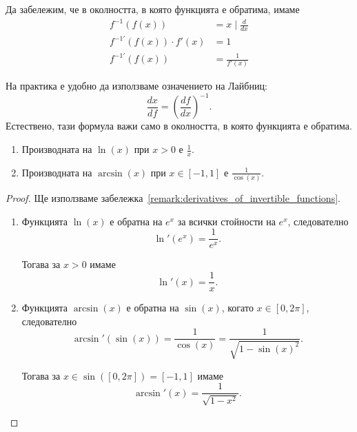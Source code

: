 \documentclass[numbers=endperiod, bibliography=totocnumbered]{scrartcl}
\begin{document}
\begin{remark}\label{remark:derivatives_of_invertible_functions}
  Да забележим, че в околността, в която функцията е обратима, имаме
  \begin{align*}
    f^{-1}(f(x)) &= x \mid \frac d {dx}
    \\
    f^{-1'}(f(x)) \cdot f'(x) &= 1
    \\
    f^{-1'}(f(x)) &= \frac 1 {f'(x)}
  \end{align*}

  На практика е удобно да използваме означението на Лайбниц:
  \begin{equation*}
    \frac {dx} {df} = {\left( \frac {df} {dx} \right)}^{-1}.
  \end{equation*}
  Естествено, тази формула важи само в околността, в която функцията е обратима.
\end{remark}

\begin{theorem}
  \mbox{}
  \begin{enumerate}
    \item Производната на \( \ln(x) \) при \( x > 0 \) е \( \frac 1 x \).
    \item Производната на \( \arcsin(x) \) при \( x \in [-1, 1] \) е \( \frac 1 {\cos(x)} \).
  \end{enumerate}
\end{theorem}
\begin{proof}
  Ще използваме забележка~\ref{remark:derivatives_of_invertible_functions}.

  \begin{enumerate}
    \item Функцията \( \ln(x) \) е обратна на \( e^x \) за всички стойности на \( e^x \), следователно
    \begin{equation*}
      \ln'(e^x) = \frac 1 {e^x}.
    \end{equation*}

    Тогава за \( x > 0 \) имаме
    \begin{equation*}
      \ln'(x) = \frac 1 {x}.
    \end{equation*}

    \item Функцията \( \arcsin(x) \) е обратна на \( \sin(x) \), когато \( x \in [0, 2\pi] \), следователно
    \begin{equation*}
      \arcsin'(\sin(x)) = \frac 1 {\cos(x)} = \frac 1 {\sqrt{1 - {\sin(x)}^2}}.
    \end{equation*}

    Тогава за \( x \in \sin([0, 2\pi]) = [-1, 1] \) имаме
    \begin{equation*}
      \arcsin'(x) = \frac 1 {\sqrt{1 - x^2}}.
    \end{equation*}
  \end{enumerate}
\end{proof}
\end{document}
